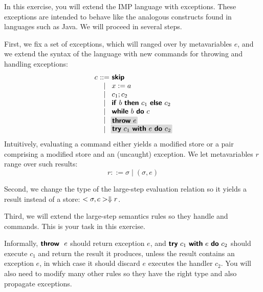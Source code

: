 \documentclass[11pt]{article}
\begin{document}
\begin{exercise}

\newcommand{\THROW}[1]{\ensuremath{\impfnt{throw}~#1}}
\newcommand{\TRYCATCH}[3]{\ensuremath{\impfnt{try}~#1~\impfnt{with}~#2~\DO~#3}}

In this exercise, you will extend the IMP language with
exceptions. These exceptions are intended to behave like the analogous
constructs found in languages such as Java. We will proceed in several
steps.

First, we fix a set of exceptions, which will ranged over by
metavariables $e$, and we extend the syntax of the language with new
commands for throwing and handling exceptions:
%
\[
\begin{array}{r@{~}c@{~}l}
 c & ::= & \SKIP \\
& \mid & x := a\\
& \mid & c_1 ; c_2\\
& \mid & \cond{b}{c_1}{c_2} \\
& \mid & \while{b}{c} \\
& \mid & \shade{\THROW{e}} \\
& \mid & \shade{\TRYCATCH{c_1}{e}{c_2}}
\end{array}
\]
%
Intuitively, evaluating a command either yields a modified store or a
pair comprising a modified store and an (uncaught) exception. We let
metavariables $r$ range over such results:
%
\[
r ::= \sigma \mid (\sigma,e)
\]
%

Second, we change the type of the large-step evaluation relation so it
yields a result instead of a store: $<\sigma,c> \Downarrow r$.

Third, we will extend the large-step semantics rules so they handle
 and  commands. This is your task in this
exercise. 

Informally, $\THROW~e$ should return exception $e$, and
$\TRYCATCH{c_1}{e}{c_2}$ should execute $c_1$ and return the result it
produces, unless the result contains an exception $e$, in which case
it should discard $e$ executes the handler $c_2$. You will also need
to modify many other rules so they have the right type and also
propagate exceptions.





\end{exercise}
\end{document}
